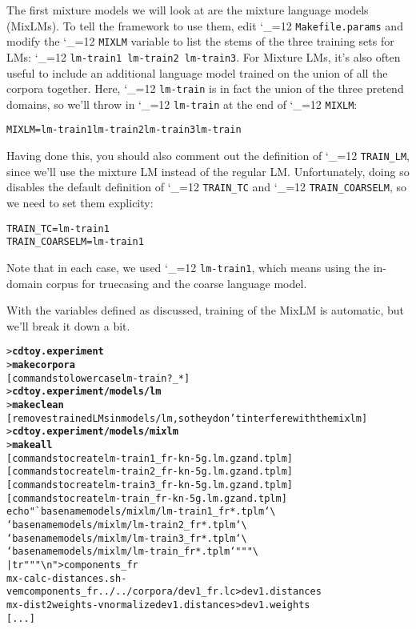 \documentclass[11pt,letterpaper]{article}
\newcommand{\bs}{\textbackslash{}}
\def\code{\begingroup\catcode`\_=12 \codex}
\newcommand{\codex}[1]{\texttt{#1}\endgroup}
\begin{document}
The first mixture models we will look at are the mixture language models
(MixLMs).  To tell the framework to use them, edit
\code{Makefile.params} and modify the \code{MIXLM} variable to list the stems
of the three training sets for LMs: \code{lm-train1 lm-train2 lm-train3}.  For
Mixture LMs, it's also often useful to include an additional language model
trained on the union of all the corpora together.  Here, \code{lm-train} is
in fact the union of the three pretend domains, so we'll throw in
\code{lm-train} at the end of \code{MIXLM}:
\begin{small}
\begin{alltt}
   MIXLM = lm-train1 lm-train2 lm-train3 lm-train
\end{alltt}
\end{small}

Having done this, you should also comment out the definition of
\code{TRAIN_LM}, since we'll use the mixture LM instead of the regular LM.
Unfortunately, doing so disables the default definition of \code{TRAIN_TC} and
\code{TRAIN_COARSELM}, so we need to set them explicity:
\begin{small}
\begin{alltt}
   TRAIN_TC = lm-train1
   TRAIN_COARSELM = lm-train1
\end{alltt}
\end{small}
Note that in each case, we used \code{lm-train1}, which means using the
in-domain corpus for truecasing and the coarse language model.

With the variables defined as discussed, training of the MixLM is automatic,
but we'll break it down a bit.
\begin{small}
\begin{alltt}
   > \textbf{cd toy.experiment}
   > \textbf{make corpora}
   [commands to lowercase lm-train?_*]
   > \textbf{cd toy.experiment/models/lm}
   > \textbf{make clean}
   [removes trained LMs in models/lm, so they don't interfere with the mixlm]
   > \textbf{cd toy.experiment/models/mixlm}
   > \textbf{make all}
   [commands to create lm-train1_fr-kn-5g.lm.gz and .tplm]
   [commands to create lm-train2_fr-kn-5g.lm.gz and .tplm]
   [commands to create lm-train3_fr-kn-5g.lm.gz and .tplm]
   [commands to create lm-train_fr-kn-5g.lm.gz and .tplm]
   echo "`basename models/mixlm/lm-train1_fr*.tplm` \bs
         `basename models/mixlm/lm-train2_fr*.tplm` \bs
         `basename models/mixlm/lm-train3_fr*.tplm` \bs
         `basename models/mixlm/lm-train_fr*.tplm`" "" \bs
      | tr " " "\bs{}n" > components_fr
   mx-calc-distances.sh -v em components_fr ../../corpora/dev1_fr.lc > dev1.distances
   mx-dist2weights -v normalize dev1.distances > dev1.weights
   [...]
\end{alltt}
\end{small}
\end{document}
